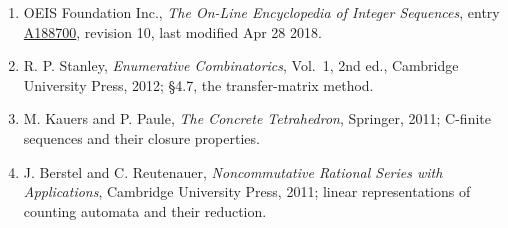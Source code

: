 \documentclass[11pt]{article}
\theoremstyle{definition}
\begin{document}
\begin{enumerate}

\item OEIS Foundation Inc., \emph{The On-Line Encyclopedia of Integer Sequences}, entry \href{https://oeis.org/A188700}{A188700}, revision 10, last modified Apr 28 2018.

\item R. P. Stanley, \emph{Enumerative Combinatorics}, Vol.~1, 2nd ed., Cambridge University Press, 2012; \S4.7, the transfer-matrix method.

\item M. Kauers and P. Paule, \emph{The Concrete Tetrahedron}, Springer, 2011; C-finite sequences and their closure properties.

\item J. Berstel and C. Reutenauer, \emph{Noncommutative Rational Series with Applications}, Cambridge University Press, 2011; linear representations of counting automata and their reduction.

\end{enumerate}
\end{document}
